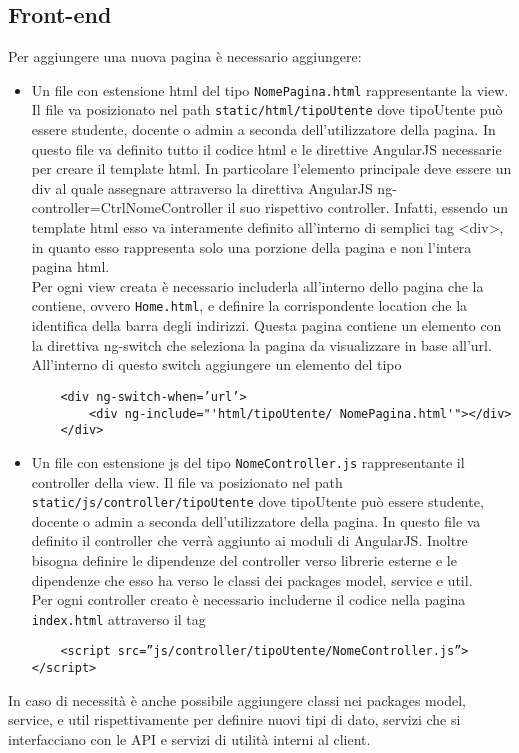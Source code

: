 \documentclass[12pt,a4paper]{article}
\begin{document}
	\subsection{Front-end}
	Per aggiungere una nuova pagina è necessario aggiungere:
	\begin{itemize}
	\item Un file con estensione html del tipo \texttt{NomePagina.html} rappresentante la view. Il file va posizionato nel path \texttt{static/html/tipoUtente} dove tipoUtente può essere studente, docente o admin a seconda dell’utilizzatore della pagina. In questo file va definito tutto il codice html e le direttive AngularJS necessarie per creare il template html. In particolare l’elemento principale deve essere un div al quale assegnare attraverso la direttiva AngularJS ng-controller=CtrlNomeController il suo rispettivo controller. Infatti, essendo un template html esso va interamente definito all'interno di semplici tag <div>, in quanto esso rappresenta solo una porzione della pagina e non l'intera pagina html.\\
	Per ogni view creata è necessario includerla all’interno dello pagina che la contiene, ovvero \texttt{Home.html}, e definire la corrispondente location che la identifica della barra degli indirizzi. Questa pagina contiene un elemento con la direttiva ng-switch che seleziona la pagina da visualizzare in base all’url. All’interno di questo switch aggiungere un elemento del tipo 
	\begin{verbatim}
	<div ng-switch-when=’url’>
		<div ng-include="'html/tipoUtente/ NomePagina.html'"></div>
	</div>
	\end{verbatim}
	\item Un file con estensione js del tipo \texttt{NomeController.js} rappresentante il controller della view. Il file va posizionato nel path \texttt{static/js/controller/tipoUtente} dove tipoUtente può essere studente, docente o admin a seconda dell’utilizzatore della pagina. In questo file va definito il controller che verrà aggiunto ai moduli di AngularJS. Inoltre bisogna definire le dipendenze del controller verso librerie esterne e le dipendenze che esso ha verso le classi dei packages model, service e util.\\
	Per ogni controller creato è necessario includerne il codice nella pagina \texttt{index.html} attraverso il tag 
	\begin{verbatim}
	<script src=”js/controller/tipoUtente/NomeController.js”></script>
	\end{verbatim}

	\end{itemize}
	In caso di necessità è anche possibile aggiungere classi nei packages model, service, e util rispettivamente per definire nuovi tipi di dato, servizi che si interfacciano con le API e servizi di utilità interni al client.
\end{document}
